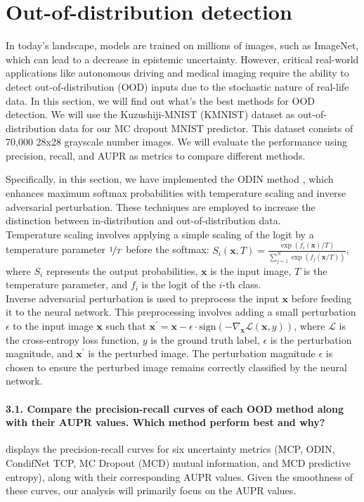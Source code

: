 \section{Out-of-distribution detection}
In today's landscape, models are trained on millions of images, such as ImageNet, which can lead to a decrease in epistemic uncertainty. However, critical real-world applications like autonomous driving and medical imaging require the ability to detect out-of-distribution (OOD) inputs due to the stochastic nature of real-life data. In this section, we will find out what's the best methods for OOD detection. We will use the Kuzushiji-MNIST (KMNIST) dataset as out-of-distribution data for our MC dropout MNIST predictor. This dataset consists of 70,000 28x28 grayscale number images. We will evaluate the performance using precision, recall, and AUPR as metrics to compare different methods.

Specifically, in this section, we have implemented the ODIN method \citep{ODIN}, which enhances maximum softmax probabilities with temperature scaling and inverse adversarial perturbation. These techniques are employed to increase the distinction between in-distribution and out-of-distribution data.\\
Temperature scaling involves applying a simple scaling of the logit by a temperature parameter $ \nicefrac{1}{T} $ before the softmax: $ S_i(\boldsymbol{x}, T) = \frac{\exp (f_i(\boldsymbol{x}) / T)}{\sum_{j=1}^{N} \exp (f_j(\boldsymbol{x} / T))} $, where $ S_i $ represents the output probabilities, $ \boldsymbol{x} $ is the input image, $ T $ is the temperature parameter, and $ f_i $ is the logit of the $ i $-th class.\\
Inverse adversarial perturbation is used to preprocess the input $ \boldsymbol{x} $ before feeding it to the neural network. This preprocessing involves adding a small perturbation $ \epsilon $ to the input image $ \boldsymbol{x} $ such that $ \boldsymbol{x}^\prime = \boldsymbol{x} - \epsilon \cdot \text{sign}(-\nabla_{\boldsymbol{x}} \mathcal{L}(\boldsymbol{x}, y)) $, where $ \mathcal{L} $ is the cross-entropy loss function, $ y $ is the ground truth label, $ \epsilon $ is the perturbation magnitude, and $ \boldsymbol{x}^\prime $ is the perturbed image. The perturbation magnitude $ \epsilon $ is chosen to ensure the perturbed image remains correctly classified by the neural network.

\paragraph*{3.1. Compare the precision-recall curves of each OOD method along with their AUPR values. Which method perform best and why?}
 displays the precision-recall curves for six uncertainty metrics (MCP, ODIN, CondifNet TCP, MC Dropout (MCD) mutual information, and MCD predictive entropy), along with their corresponding AUPR values. Given the smoothness of these curves, our analysis will primarily focus on the AUPR values.

